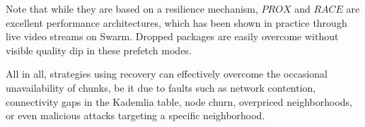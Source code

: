 \documentclass[manuscript,screen,review]{acmart}
\begin{document}
%
%


Note that while they are based on a resilience mechanism, $PROX$ and $RACE$ are excellent performance architectures, which has been shown in practice through live video streams on Swarm. Dropped packages are easily overcome without visible quality dip in these prefetch modes.

All in all, strategies using recovery can effectively overcome the occasional unavailability of chunks, be it due to faults such as network contention, connectivity gaps in the Kademlia table, node churn, overpriced neighborhoods, or even malicious attacks targeting a specific neighborhood. 
\end{document}
